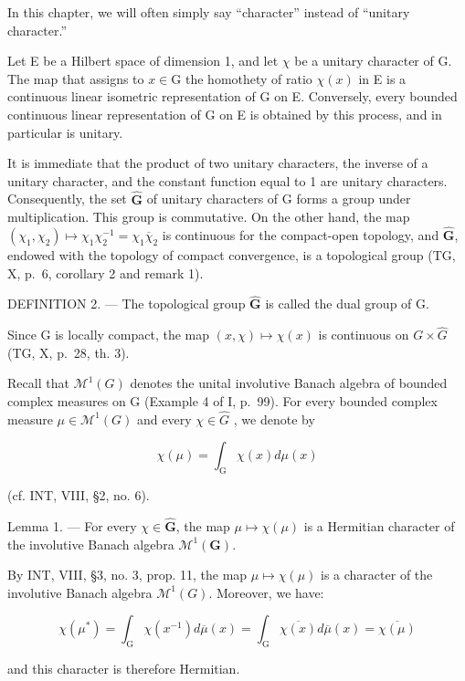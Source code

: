 In this chapter, we will often simply say “character” instead of “unitary character.”

Let E be a Hilbert space of dimension 1, and let \(\chi\) be a unitary character of G. The map that assigns to \(x \in \mathrm{G}\) the homothety of ratio \(\chi(x)\) in E is a continuous linear isometric representation of G on E. Conversely, every bounded continuous linear representation of G on E is obtained by this process, and in particular is unitary.

It is immediate that the product of two unitary characters, the inverse of a unitary character, and the constant function equal to 1 are unitary characters. Consequently, the set \(\widehat{\mathbf{G}}\) of unitary characters of G forms a group under multiplication. This group is commutative. On the other hand, the map \((\chi_1,\chi_2)\mapsto \chi_1\chi_2^{-1} = \chi_1\overline{\chi}_2\) is continuous for the compact-open topology, and \(\widehat{\mathbf{G}}\), endowed with the topology of compact convergence, is a topological group (TG, X, p.~6, corollary 2 and remark 1).

DEFINITION 2. --- The topological group \(\widehat{\mathbf{G}}\) is called the dual group of G.

Since G is locally compact, the map \((x,\chi)\mapsto\chi(x)\) is continuous on \(G\times\widehat{G}\) (TG, X, p.~28, th. 3).

Recall that \(\mathcal{M}^{1}(G)\) denotes the unital involutive Banach algebra of bounded complex measures on G (Example 4 of I, p.~99). For every bounded complex measure \(\mu\in\mathcal{M}^{1}(G)\) and every \(\chi\in\widehat{G}\) , we denote by

\[
\chi (\mu) = \int_ {\mathrm{G}} \chi (x) d \mu (x)\tag{1}
\]

(cf. INT, VIII, §2, no. 6).

Lemma 1. --- For every \(\chi \in \widehat{\mathbf{G}}\), the map \(\mu \mapsto \chi(\mu)\) is a Hermitian character of the involutive Banach algebra \(\mathcal{M}^1(\mathbf{G})\).

By INT, VIII, §3, no. 3, prop. 11, the map \(\mu \mapsto \chi(\mu)\) is a character of the involutive Banach algebra \(\mathcal{M}^{1}(G)\). Moreover, we have:

\[
\chi (\mu^ {*}) = \int_ {\mathrm{G}} \chi (x ^ {- 1}) d \overline {{\mu}} (x) = \int_ {\mathrm{G}} \overline {{\chi (x)}} d \overline {{\mu}} (x) = \overline {{\chi (\mu)}}
\]

and this character is therefore Hermitian.

